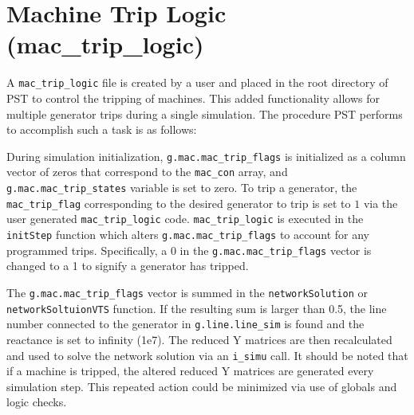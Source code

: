 \section{Machine Trip Logic (mac\_trip\_logic)}  
A \verb|mac_trip_logic| file is created by a user and placed in the root directory of PST to control the tripping of machines.
This added functionality allows for multiple generator trips during a single simulation.
The procedure PST performs to accomplish such a task is as follows:

During simulation initialization, \verb|g.mac.mac_trip_flags| is initialized as a column vector of zeros that correspond to the \verb|mac_con| array, and 
\verb|g.mac.mac_trip_states| variable is set to zero. %
To trip a generator, the \verb|mac_trip_flag| corresponding to the desired generator to trip is set to $1$ via the user generated \verb|mac_trip_logic| code.
\verb|mac_trip_logic| is executed in the \verb|initStep| function which alters \verb|g.mac.mac_trip_flags| to account for any programmed trips.
Specifically, a $0$ in the \verb|g.mac.mac_trip_flags| vector is changed to a 1 to signify a generator has tripped.


The \verb|g.mac.mac_trip_flags| vector is summed in the \verb|networkSolution| or \\ \verb|networkSoltuionVTS|  function.
If the resulting sum is larger than 0.5, the line number connected to the generator in \verb|g.line.line_sim| is found and the reactance is set to infinity (1e7).
The reduced Y matrices are then recalculated and used to solve the network solution via an \verb|i_simu| call.
It should be noted that if a machine is tripped, the altered reduced Y matrices are generated every simulation step.
This repeated action could be minimized via use of globals and logic checks.